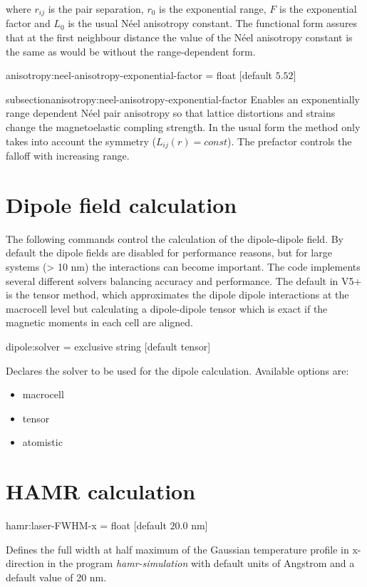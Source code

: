 \noindent where $r_{ij}$ is the pair separation, $r_0$ is the exponential range, $F$ is the exponential factor and $L_0$ is the usual N\'eel anisotropy constant. The functional form assures that at the first neighbour distance the value of the N\'eel anisotropy constant is the same as would be without the range-dependent form.

{\zicf anisotropy:neel-anisotropy-exponential-factor = float [default $5.52$]}
{subsection}{anisotropy:neel-anisotropy-exponential-factor} Enables an exponentially range dependent N\'eel pair anisotropy so that lattice distortions and strains change the magnetoelastic compling strength. In the usual form the method only takes into account the symmetry ($L_{ij}(r)
= const$). The prefactor controls the falloff with increasing range.

\section*{Dipole field calculation}
The following commands control the calculation of the dipole-dipole field. By default the dipole fields are disabled for performance reasons, but for large systems (> 10 nm) the interactions can become important. The \vampire code implements several different solvers balancing accuracy and performance. The default in V5+ is the tensor method, which approximates the dipole dipole interactions at the macrocell level but calculating a dipole-dipole tensor which is exact if the magnetic moments in each cell are aligned.

{\zicf dipole:solver = exclusive string [default tensor]}
Declares the solver to be used for the dipole calculation. Available options are:
\begin{itemize}
  \item[] macrocell
  \item[] tensor
  \item[] atomistic
\end{itemize}

\section*{HAMR calculation}
{\zicf hamr:laser-FWHM-x = float [default $20.0$ nm]}
Defines the full width at half maximum of the Gaussian temperature profile in x-direction
in the program \textit{hamr-simulation} with default units of Angstrom and a default value of 20 nm.

